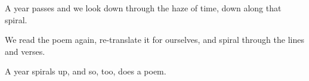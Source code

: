 \documentclass[12pt,oneside]{memoir}
\begin{document}
A year passes and we look down through the haze of time, down along that spiral.

We read the poem again, re-translate it for ourselves, and spiral through the lines and verses.

A year spirals up, and so, too, does a poem.




\printbibliography
\end{document}
